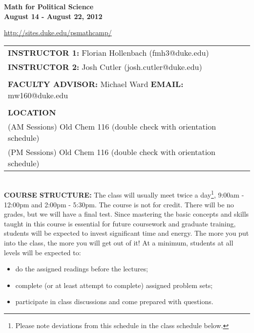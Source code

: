 \documentclass[12pt,a4paper]{article}
\begin{document}
 \begin{center}

     {\LARGE \textbf{Math for Political Science}}\\
     
     {\large \textbf{August 14 - August 22, 2012}}\\
      
     \mbox{}
     
   \url{http://sites.duke.edu/psmathcamp/}

     \mbox{}
     
     
\end{center}

\begin{small}

\begin{tabular}{l l}
\textbf{INSTRUCTOR 1:} Florian Hollenbach (fmh3@duke.edu)    &    \\
\textbf{INSTRUCTOR 2:} Josh Cutler (josh.cutler@duke.edu)&\\
& \\
\textbf{FACULTY ADVISOR:} Michael Ward    \textbf{EMAIL:} mw160@duke.edu &\\
      &     \\
 \textbf{LOCATION}			&   \\
 (AM Sessions) Old Chem 116 (double check with orientation schedule)&\\
 (PM Sessions) Old Chem 116 (double check with orientation schedule)& \\
 


\end{tabular}

\end{small}  
\mbox{}\\

\textbf{COURSE STRUCTURE:} The class will usually meet twice a day\footnote{Please note deviations from this schedule in the class schedule below.}, 9:00am - 12:00pm and 2:00pm - 5:30pm. The course is not for credit. There will be no grades, but we will have a final test. Since mastering the basic concepts and skills taught in this course is essential for future coursework and graduate training, students will be expected to invest significant time and energy. The more you put into the class, the more you will get out of it! At a minimum, students at all levels will be expected to:
\begin{itemize}
\item do the assigned readings before the lectures;
\item complete (or at least attempt to complete) assigned problem sets;
\item participate in class discussions and come prepared with questions.
\end{itemize}
\end{document}
